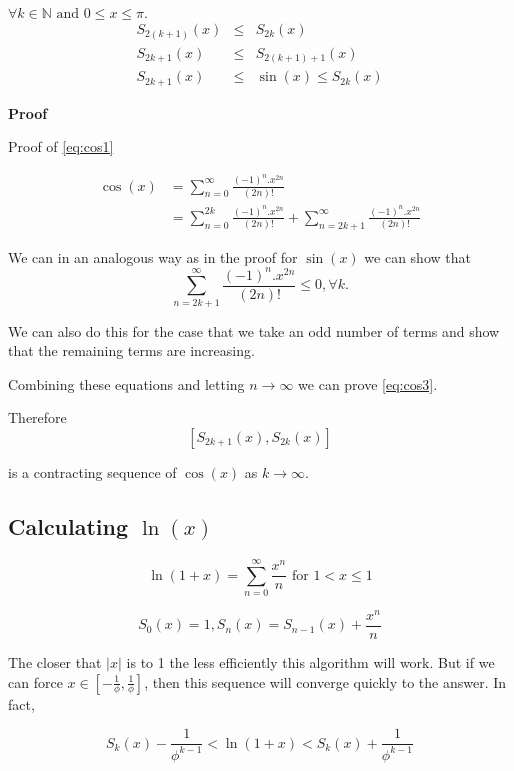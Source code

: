 \documentclass{cs4rep}
\begin{document}
\begin{myprop}
$\forall k \in \mathbb{N} \mbox{ and } 0 \leq x \leq \pi.$
\begin{eqnarray}
S_{2(k+1)}(x) & \leq & S_{2k}(x) \label{eq:cos1} \\
S_{2k+1}(x) & \leq & S_{2(k+1)+1}(x) \label{eq:cos2} \\
S_{2k+1}(x) & \leq & \sin(x) \leq S_{2k}(x) \label{eq:cos3}
\end{eqnarray}
\end{myprop}

{\bf Proof}

Proof of \ref{eq:cos1}

\[ \begin{array}{ll}
\cos(x) & = \sum_{n=0}^{\infty} \frac{(-1)^{n}.x^{2n}}{(2n)!} \\
& = \sum_{n=0}^{2k} \frac{(-1)^{n}.x^{2n}}{(2n)!} + \sum_{n=2k+1}^{\infty} \frac{(-1)^{n}.x^{2n}}{(2n)!}
\end{array} \]

We can in an analogous way as in the proof for $\sin(x)$ we can show that
\[ \sum_{n=2k+1}^{\infty} \frac{(-1)^{n}.x^{2n}}{(2n)!} \leq 0, \forall k. \]

We can also do this for the case that we take an odd number of terms
and show that the remaining terms are increasing.

Combining these equations and letting $n \rightarrow \infty$ we can
prove \ref{eq:cos3}.

Therefore \[ [S_{2k+1}(x), S_{2k}(x)] \] 

is a contracting sequence of $\cos(x)$ as $k \rightarrow \infty$.

\subsection*{Calculating $\ln(x)$}
\[ \ln(1+x) = \sum_{n=0}^{\infty} \frac{x^{n}}{n} \mbox{ for } 1 < x \leq 1 \]

\[ S_{0}(x) = 1, S_{n}(x) = S_{n-1}(x) + \frac{x^{n}}{n} \]

The closer that $|x|$ is to 1 the less efficiently this algorithm will
work. But if we can force $ x \in [ - \frac{1}{\phi}, \frac{1}{\phi}]
$, then this sequence will converge quickly to the answer. In fact,

\begin{equation}
S_{k}(x) - \frac{1}{\phi^{k-1}} < \ln(1+x) < S_{k}(x) + \frac{1}{\phi^{k-1}} \label{eq:log1}
\end{equation}
\end{document}
